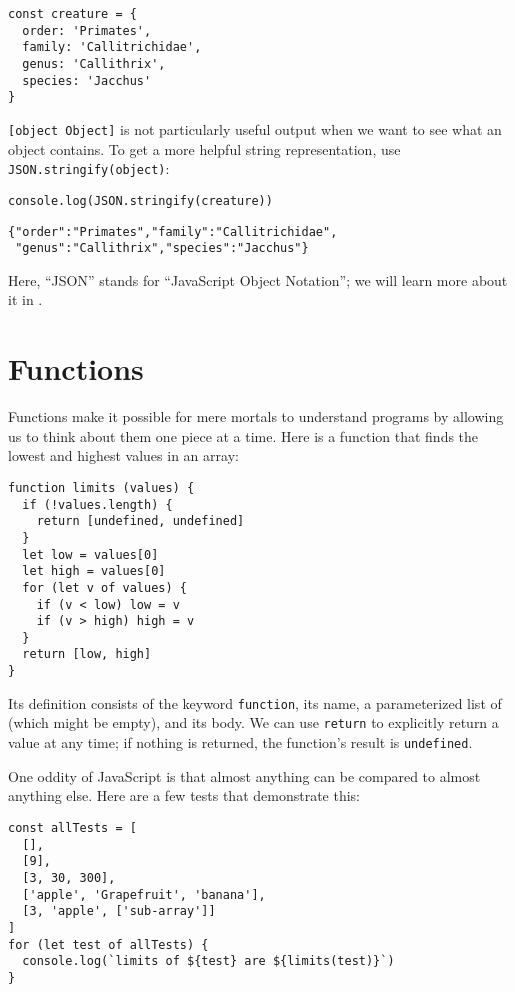 \begin{verbatim}
const creature = {
  order: 'Primates',
  family: 'Callitrichidae',
  genus: 'Callithrix',
  species: 'Jacchus'
}
\end{verbatim}

\texttt{{[}object\ Object{]}} is not particularly useful output when we want to see what an object contains.
To get a more helpful string representation,
use \texttt{JSON.stringify(object)}:

\begin{verbatim}
console.log(JSON.stringify(creature))
\end{verbatim}

\begin{verbatim}
{"order":"Primates","family":"Callitrichidae",
 "genus":"Callithrix","species":"Jacchus"}
\end{verbatim}

Here,
``JSON'' stands for ``JavaScript Object Notation'';
we will learn more about it in .

\section{Functions}\label{s:basics-functions}

Functions make it possible for mere mortals to understand programs
by allowing us to think about them one piece at a time.
Here is a function that finds the lowest and highest values in an array:

\begin{verbatim}
function limits (values) {
  if (!values.length) {
    return [undefined, undefined]
  }
  let low = values[0]
  let high = values[0]
  for (let v of values) {
    if (v < low) low = v
    if (v > high) high = v
  }
  return [low, high]
}
\end{verbatim}

Its definition consists of the keyword \texttt{function},
its name,
a parameterized list of  (which might be empty),
and its body.
We can use \texttt{return} to explicitly return a value at any time;
if nothing is returned,
the function's result is \texttt{undefined}.

One oddity of JavaScript is that almost anything can be compared to almost anything else.
Here are a few tests that demonstrate this:

\begin{verbatim}
const allTests = [
  [],
  [9],
  [3, 30, 300],
  ['apple', 'Grapefruit', 'banana'],
  [3, 'apple', ['sub-array']]
]
for (let test of allTests) {
  console.log(`limits of ${test} are ${limits(test)}`)
}
\end{verbatim}


